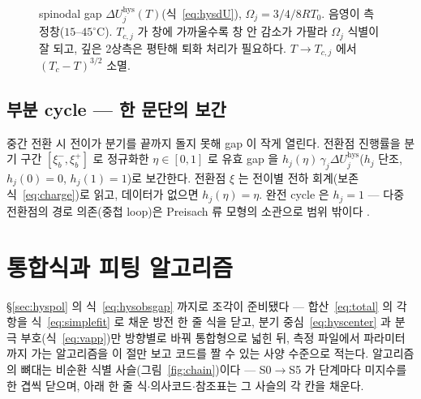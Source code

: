 \documentclass[11pt,a4paper]{article}
\newcommand{\hys}{\mathrm{hys}}
\begin{document}
\begin{figure}[t]
\centering
{}
\caption{spinodal gap $\Delta U_j^\hys(T)$(식~\eqref{eq:hysdU}), $\Omega_j=3/4/8RT_0$. 음영이 측정창($15$--$45^\circ$C). $T_{c,j}$ 가 창에 가까울수록 창 안 감소가 가팔라 $\Omega_j$ 식별이 잘 되고, 깊은 2상측은 평탄해 퇴화 처리가 필요하다. $T\to T_{c,j}$ 에서 $(T_c-T)^{3/2}$ 소멸.}
\label{fig:gapT}
\end{figure}

\subsection{부분 cycle — 한 문단의 보간}
중간 전환 시 전이가 분기를 끝까지 돌지 못해 gap 이 작게 열린다. 전환점 진행률을 분기 구간 $[\xi_b^-,\xi_b^+]$ 로 정규화한 $\eta\in[0,1]$ 로 유효 gap 을 $h_j(\eta)\,\gamma_j\Delta U_j^\hys$($h_j$ 단조, $h_j(0)=0$, $h_j(1)=1$)로 보간한다. 전환점 $\xi$ 는 전이별 전하 회계(보존식~\eqref{eq:charge})로 읽고, 데이터가 없으면 $h_j(\eta)=\eta$. 완전 cycle 은 $h_j=1$ — 다중 전환점의 경로 의존(중첩 loop)은 Preisach 류 모형의 소관으로 범위 밖이다 \cite{sethna1993}.

\section{통합식과 피팅 알고리즘}\label{sec:master}
\S\ref{sec:hyspol} 의 식~\eqref{eq:hysobsgap} 까지로 조각이 준비됐다 — 합산~\eqref{eq:total} 의 각 항을 식~\eqref{eq:simplefit} 로 채운 방전 한 줄 식을 닫고, 분기 중심~\eqref{eq:hyscenter} 과 분극 부호(식~\eqref{eq:vapp})만 방향별로 바꿔 통합형으로 넓힌 뒤, 측정 파일에서 파라미터까지 가는 알고리즘을 이 절만 보고 코드를 짤 수 있는 사양 수준으로 적는다. 알고리즘의 뼈대는 비순환 식별 사슬(그림~\ref{fig:chain})이다 — S0$\to$S5 가 단계마다 미지수를 한 겹씩 닫으며, 아래 한 줄 식$\cdot$의사코드$\cdot$참조표는 그 사슬의 각 칸을 채운다.
\end{document}
